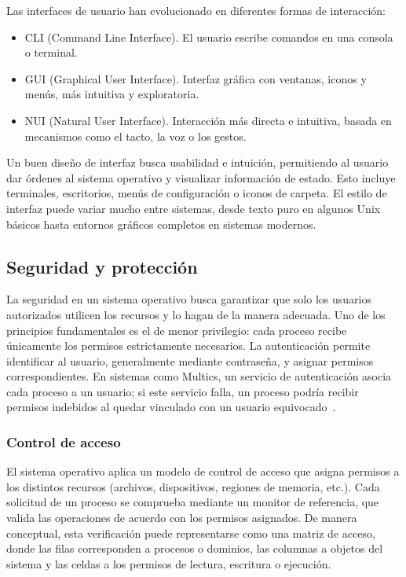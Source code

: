 Las interfaces de usuario han evolucionado en diferentes formas de interacción:
\begin{itemize}
    \item CLI (Command Line Interface). El usuario escribe comandos en una consola o terminal.
    \item GUI (Graphical User Interface). Interfaz gráfica con ventanas, iconos y menús, más intuitiva y exploratoria.
    \item NUI (Natural User Interface). Interacción más directa e intuitiva, basada en mecanismos como el tacto, la voz o los gestos.
\end{itemize}

Un buen diseño de interfaz busca usabilidad e intuición, permitiendo al usuario dar órdenes al sistema operativo y visualizar información de estado. 
Esto incluye terminales, escritorios, menús de configuración o iconos de carpeta. El estilo de interfaz puede variar mucho entre sistemas, 
desde texto puro en algunos Unix básicos hasta entornos gráficos completos en sistemas modernos.

\subsection{Seguridad y protección}
La seguridad en un sistema operativo busca garantizar que solo los usuarios autorizados utilicen los recursos y lo hagan de la manera adecuada. 
Uno de los principios fundamentales es el de menor privilegio: cada proceso recibe únicamente los permisos estrictamente necesarios.  
La autenticación permite identificar al usuario, generalmente mediante contraseña, y asignar permisos correspondientes. 
En sistemas como Multics, un servicio de autenticación asocia cada proceso a un usuario; si este servicio falla, un proceso podría recibir permisos indebidos al quedar vinculado con un usuario equivocado~\citep{columbia2008}.

\subsubsection{Control de acceso}
El sistema operativo aplica un modelo de control de acceso que asigna permisos a los distintos recursos (archivos, dispositivos, regiones de memoria, etc.).  
Cada solicitud de un proceso se comprueba mediante un monitor de referencia, que valida las operaciones de acuerdo con los permisos asignados.  
De manera conceptual, esta verificación puede representarse como una matriz de acceso, donde las filas corresponden a procesos o dominios, 
las columnas a objetos del sistema y las celdas a los permisos de lectura, escritura o ejecución.  

